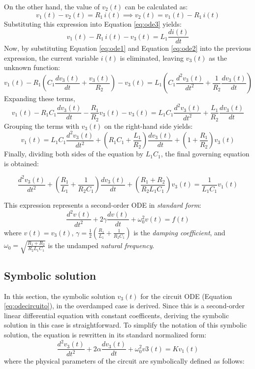 \documentclass[11pt, a4paper]{article}
\begin{document}
On the other hand, the value of $v_2(t)$ can be calculated as:
$$v_1(t) - v_2(t) = R_1 \,  i(t) \implies v_2(t) = v_1(t) - R_1 \,  i(t)$$
Substituting this expression into Equation \ref{eq:ode3} yields:
$$v_1(t) - R_1 \,  i(t) - v_3(t) = L_1 \frac{di(t)}{dt}$$
Now, by substituting Equation \ref{eq:ode1} and Equation \ref{eq:ode2} into the previous expression, the current variable $i(t)$ is eliminated, leaving $v_3(t)$ as the unknown function:
$$v_1(t) - R_1 \left( C_1 \frac{dv_3(t)} {dt} + \frac{v_3(t)}{R_2} \right) - v_3(t) = L_1 \left( C_1 \frac{d^2v_3(t)}{dt^2} + \frac{1}{R_2} \frac{dv_3(t)}{dt} \right)$$
Expanding these terms,
$$v_1(t) - R_1C_1 \frac{dv_3(t)} {dt} - \frac{R_1}{R_2}v_3(t) - v_3(t) = L_1C_1 \frac{d^2v_3(t)}{dt^2} + \frac{L_1}{R_2} \frac{dv_3(t)}{dt}$$
Grouping the terms with $v_3(t)$ on the right-hand side yields:
$$v_1(t) = L_1C_1 \frac{d^2v_3(t)}{dt^2} + \left( R_1C_1 + \frac{L_1}{R_2} \right) \frac{dv_3(t)} {dt} + \left( 1 + \frac{R_1}{R_2} \right) v_3(t)$$
Finally, dividing both sides of the equation by $L_1C_1$, the final governing equation is obtained:

\begin{equation}
	\frac{d^2v_3(t)}{dt^2} + \left( \frac{R_1}{L_1} + \frac{1}{R_2C_1} \right) \frac{dv_3(t)}{dt} + \left( \frac{R_1 + R_2}{R_2L_1C_1} \right) v_3(t) = \frac{1}{L_1C_1} v_1(t)
	\label{eq:odecircuito}
\end{equation}

This expression represents a second-order ODE in \textit{standard form}:
$$\frac{d^2v(t)}{dt^2} + 2\gamma \frac{dv(t)}{dt} + \omega_0^2 v(t) = f(t)$$
where $v(t)=v_3(t)$, $\gamma = \frac{1}{2} \left( \frac{R_1}{L_1} + \frac {1}{R_2C_1} \right)$ is the \textit{damping coefficient}, and $\omega_0 = \sqrt{\frac{R_1 + R_2}{R_2L_1C_1}}$ is the undamped \textit{natural frequency}.



\subsection{Symbolic solution}

In this section, the symbolic solution $v_3(t)$ for the circuit ODE (Equation \ref{eq:odecircuito}), in the overdamped case is derived. Since this is a second-order linear differential equation with constant  coefficents, deriving the symbolic solution in this case is straightforward. To simplify the notation
of this symbolic solution, the equation is rewritten in its standard normalized form:
\[
\frac{d^2 v_3 (t)}{d t^2} + 2\alpha \frac{d v_3 (t)}{d t}+ \omega_0^2 v3 (t) = K v_1 (t)
\]
where the physical parameters of the circuit are symbolically defined as follows:
\end{document}
